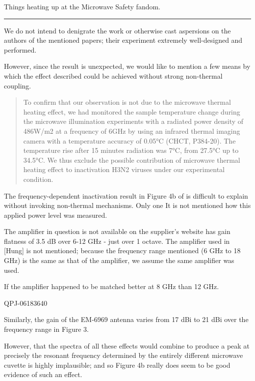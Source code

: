 \documentclass[paper.tex]{subfiles}
\begin{document}
Things heating up at the Microwave Safety fandom.


\clearpage
\rule{\linewidth}{0.2pt}

We do not intend to denigrate the work or otherwise cast aspersions on the authors of the mentioned papers; their experiment extremely well-designed and performed. 

However, since the result is unexpected, we would like to mention a few means by which the effect described could be achieved without strong non-thermal coupling.

\begin{quote}

 To confirm that our observation is not due to the microwave thermal heating effect, we had monitored the sample temperature change during the microwave illumination experiments with a radiated power density of 486W/m2 at a frequency of 6GHz by using an infrared thermal imaging camera with a temperature accuracy of 0.05°C (CHCT, P384-20). The temperature rise after 15 minutes radiation was 7°C, from 27.5°C up to 34.5°C. We thus exclude the possible contribution of microwave thermal heating effect to inactivation H3N2 viruses under our experimental condition.

\end{quote}

The frequency-dependent inactivation result in Figure 4b of \cite{Efficient2015} is difficult to explain without invoking non-thermal mechanisms. Only one  It is not mentioned how this applied power level was measured. 

The amplifier in question is not available on the supplier's website \cite{Microwaved} has gain flatness of 3.5 dB over 6-12 GHz - just over 1 octave. The amplifier used in [Hung] is not mentioned; because the frequency range mentioned (6 GHz to 18 GHz) is the same as that of the amplifier, we assume the same amplifier was used. 

If the amplifier happened to be matched better at 8 GHz than 12 GHz.



QPJ-06183640

Similarly, the gain of the EM-6969 antenna\cite{EM6969} varies from 17 dBi to 21 dBi over the frequency range in Figure 3.

However, that the spectra of all these effects would combine to produce a peak at precisely the resonant frequency determined by the entirely different microwave cuvette is highly implausible; and so Figure 4b really does seem to be good evidence of such an effect.
\end{document}
